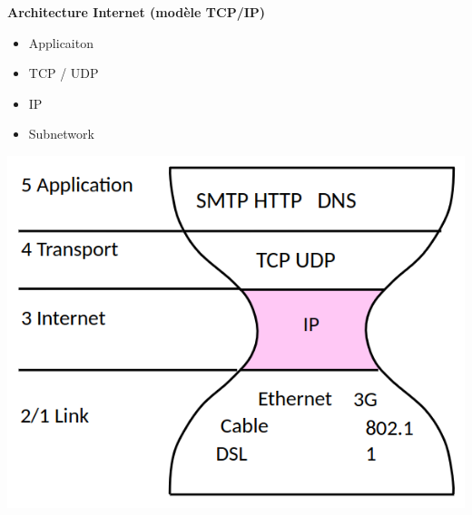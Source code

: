 \documentclass[12pt]{article}
\begin{document}
\textbf{Architecture Internet (modèle TCP/IP)}
\begin{itemize}
    \item Applicaiton
    \item TCP / UDP
    \item IP
    \item Subnetwork
\end{itemize}

\begin{minipage}{0.6\textwidth}
    \includegraphics[scale=0.4]{architecture_internet_sablier.png}
\end{minipage}
\end{document}
